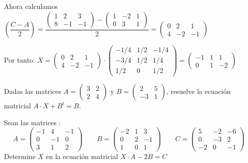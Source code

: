 \begin{ejemplo}
Ahora calculamos $\left( \dfrac{C-A}{2} \right) = 
\dfrac
{\begin{pmatrix}
1 & 2 & 3 \\ 
8 & -1 & -1 
\end{pmatrix} - 
\begin{pmatrix}
1 & -2 & 1 \\
0 & 3 & 1 
\end{pmatrix}}{2}= 
\begin{pmatrix}
0 & 2 & 1 \\
4 & -2 & -1 
\end{pmatrix}$

Por tanto: $X=\begin{pmatrix}
0 & 2 & 1 \\
4 & -2 & -1 
\end{pmatrix} 
\cdot
\begin{pmatrix}
-1/4 & 1/2 & -1/4 \\
 -3/4 & 1/2 & 1/4 \\
 1/2 & 0 & 1/2
\end{pmatrix}=
\begin{pmatrix}
-1 & 1 & 1 \\
0 & 1 & -2 
\end{pmatrix}$
\end{ejemplo}

\begin{ejer}
Dadas las matrices 
$A=\begin{pmatrix}
3 & 2 \\
2 & 4
\end{pmatrix} $ y 
$B=\begin{pmatrix}
2 & 5 \\
-3 & 1
\end{pmatrix}$, resuelve la ecuación matricial $A\cdot X+B^t=B$.
\begin{solu}
\end{solu}
\end{ejer}

\begin{ejer}
 Sean las matrices :
\[ A=\begin{pmatrix}
-1 & 4 & -1 \\
0 & -1 & 0 \\
3 & 1 & 2 
\end{pmatrix}
\qquad
B=\begin{pmatrix}
-2 & 1 & 3 \\
0 & 2 & -1 \\
1 & 0 & 1 
\end{pmatrix}
\qquad
C=\begin{pmatrix}
5 & -2 & -6 \\
0 & -3 & 2 \\
-2 & 0 & -1 
\end{pmatrix} \]
Determine $X$ en la ecuación matricial $X \cdot A -2B=C$
\begin{solu}
\end{solu}
\end{ejer}

